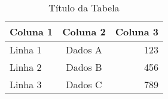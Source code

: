 
\begin{table}[htbp]
    \centering
    \caption{Título da Tabela}
    \label{tab:exemplo}
    \begin{tabular}{|l|c|r|}
        \hline
        \textbf{Coluna 1} & \textbf{Coluna 2} & \textbf{Coluna 3} \\
        \hline
        Linha 1 & Dados A & 123 \\
        Linha 2 & Dados B & 456 \\
        Linha 3 & Dados C & 789 \\
        \hline
    \end{tabular}
\end{table}







